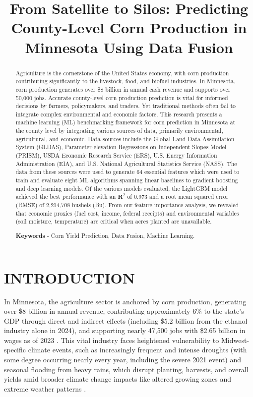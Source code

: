 \documentclass[10pt,twocolumn]{article}
\title{From Satellite to Silos: Predicting County-Level Corn Production in Minnesota Using Data Fusion}
\author{}
\date{}
\begin{document}
\maketitle

\begin{abstract}
Agriculture is the cornerstone of the United States economy, with corn production contributing significantly to the livestock, food, and biofuel industries. In Minnesota, corn production generates over \$8 billion in annual cash revenue and supports over 50,000 jobs. Accurate county-level corn production prediction is vital for informed decisions by farmers, policymakers, and traders. Yet traditional methods often fail to integrate complex environmental and economic factors. This research presents a machine learning (ML) benchmarking framework for corn prediction in Minnesota at the county level by integrating various sources of data, primarily environmental, agricultural, and economic. Data sources include the Global Land Data Assimilation System (GLDAS), Parameter-elevation Regressions on Independent Slopes Model (PRISM), USDA Economic Research Service (ERS), U.S. Energy Information Administration (EIA), and U.S. National Agricultural Statistics Service (NASS). The data from these sources were used to generate 64 essential features which were used to train and evaluate eight ML algorithms spanning linear baselines to gradient boosting and deep learning models. Of the various models evaluated, the LightGBM model achieved the best performance with an $\mathbf{R}^{2}$ of 0.973 and a root mean squared error (RMSE) of 2,214,708 bushels (Bu). From our feature importance analysis, we revealed that economic proxies (fuel cost, income, federal receipts) and environmental variables (soil moisture, temperature) are critical when acres planted are unavailable.

\textbf{Keywords} - Corn Yield Prediction, Data Fusion, Machine Learning.
\end{abstract}

\section{INTRODUCTION}

In Minnesota, the agriculture sector is anchored by corn production, generating over \$8 billion in annual revenue, contributing approximately 6\% to the state's GDP through direct and indirect effects (including \$5.2 billion from the ethanol industry alone in 2024), and supporting nearly 47,500 jobs with \$2.65 billion in wages as of 2023 \cite{usda2023}. This vital industry faces heightened vulnerability to Midwest-specific climate events, such as increasingly frequent and intense droughts (with some degree occurring nearly every year, including the severe 2021 event) and seasonal flooding from heavy rains, which disrupt planting, harvests, and overall yields amid broader climate change impacts like altered growing zones and extreme weather patterns \cite{rodell2004}.
\end{document}
